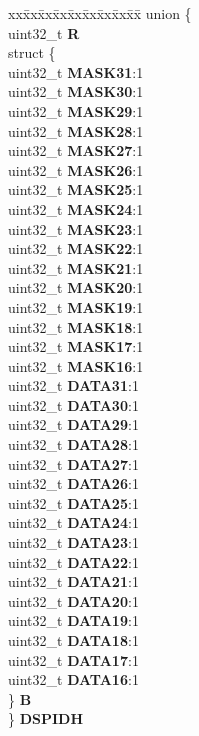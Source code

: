 \begin{DoxyCompactItemize}
\begin{tabbing}
\end{tabbing}\item 
\mbox{\label{structSIU__tag_a46a84f9f32f3a2a7743137315ce15178}} 
\begin{tabbing}
xx\=xx\=xx\=xx\=xx\=xx\=xx\=xx\=xx\=\kill
union \{\\
\>uint32\_t {\bfseries R}\\
\>struct \{\\
\>\>uint32\_t {\bfseries MASK31}:1\\
\>\>uint32\_t {\bfseries MASK30}:1\\
\>\>uint32\_t {\bfseries MASK29}:1\\
\>\>uint32\_t {\bfseries MASK28}:1\\
\>\>uint32\_t {\bfseries MASK27}:1\\
\>\>uint32\_t {\bfseries MASK26}:1\\
\>\>uint32\_t {\bfseries MASK25}:1\\
\>\>uint32\_t {\bfseries MASK24}:1\\
\>\>uint32\_t {\bfseries MASK23}:1\\
\>\>uint32\_t {\bfseries MASK22}:1\\
\>\>uint32\_t {\bfseries MASK21}:1\\
\>\>uint32\_t {\bfseries MASK20}:1\\
\>\>uint32\_t {\bfseries MASK19}:1\\
\>\>uint32\_t {\bfseries MASK18}:1\\
\>\>uint32\_t {\bfseries MASK17}:1\\
\>\>uint32\_t {\bfseries MASK16}:1\\
\>\>uint32\_t {\bfseries DATA31}:1\\
\>\>uint32\_t {\bfseries DATA30}:1\\
\>\>uint32\_t {\bfseries DATA29}:1\\
\>\>uint32\_t {\bfseries DATA28}:1\\
\>\>uint32\_t {\bfseries DATA27}:1\\
\>\>uint32\_t {\bfseries DATA26}:1\\
\>\>uint32\_t {\bfseries DATA25}:1\\
\>\>uint32\_t {\bfseries DATA24}:1\\
\>\>uint32\_t {\bfseries DATA23}:1\\
\>\>uint32\_t {\bfseries DATA22}:1\\
\>\>uint32\_t {\bfseries DATA21}:1\\
\>\>uint32\_t {\bfseries DATA20}:1\\
\>\>uint32\_t {\bfseries DATA19}:1\\
\>\>uint32\_t {\bfseries DATA18}:1\\
\>\>uint32\_t {\bfseries DATA17}:1\\
\>\>uint32\_t {\bfseries DATA16}:1\\
\>\} {\bfseries B}\\
\} {\bfseries DSPIDH}\\


\end{tabbing}
\end{DoxyCompactItemize}
